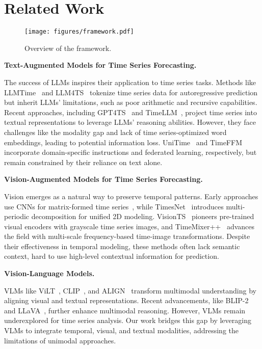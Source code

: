 \section{Related Work}

\begin{figure*}[t!]
    \centering
    \texttt{[image: figures/framework.pdf]}
    \caption{Overview of the \method framework.}
    \label{fig:framework}
    \vspace{-1em}
\end{figure*}

\noindent\textbf{Text-Augmented Models for Time Series Forecasting.} 

The success of LLMs inspires their application to time series tasks. Methods like LLMTime~\cite{gruver2023large} and LLM4TS~\cite{chang2023llm4ts} tokenize time series data for autoregressive prediction but inherit LLMs' limitations, such as poor arithmetic and recursive capabilities. Recent approaches, including GPT4TS~\cite{zhou2023one} and TimeLLM~\cite{jin2023time}, project time series into textual representations to leverage LLMs' reasoning abilities. However, they face challenges like the modality gap and lack of time series-optimized word embeddings, leading to potential information loss. UniTime~\cite{liu2024unitime} and TimeFFM~\cite{liu2024time} incorporate domain-specific instructions and federated learning, respectively, but remain constrained by their reliance on text alone.

\noindent\textbf{Vision-Augmented Models for Time Series Forecasting.} 

Vision emerges as a natural way to preserve temporal patterns. Early approaches use CNNs for matrix-formed time series~\cite{li2020forecasting, sood2021visual}, while TimesNet~\cite{wu2023timesnet} introduces multi-periodic decomposition for unified 2D modeling. VisionTS~\cite{chen2024visiontsvisualmaskedautoencoders} pioneers pre-trained visual encoders with grayscale time series images, and TimeMixer++~\cite{wang2024timemixer++} advances the field with multi-scale frequency-based time-image transformations. Despite their effectiveness in temporal modeling, these methods often lack semantic context, hard to use high-level contextual information for prediction.

\noindent\textbf{Vision-Language Models.} 

VLMs like ViLT~\cite{kim2021vilt}, CLIP~\cite{radford2021learning}, and ALIGN~\cite{jia2021scaling} transform multimodal understanding by aligning visual and textual representations. Recent advancements, like BLIP-2~\cite{li2022blip2} and LLaVA~\cite{liu2023visual}, further enhance multimodal reasoning. However, VLMs remain underexplored for time series analysis. Our work bridges this gap by leveraging VLMs to integrate temporal, visual, and textual modalities, addressing the limitations of unimodal approaches.
